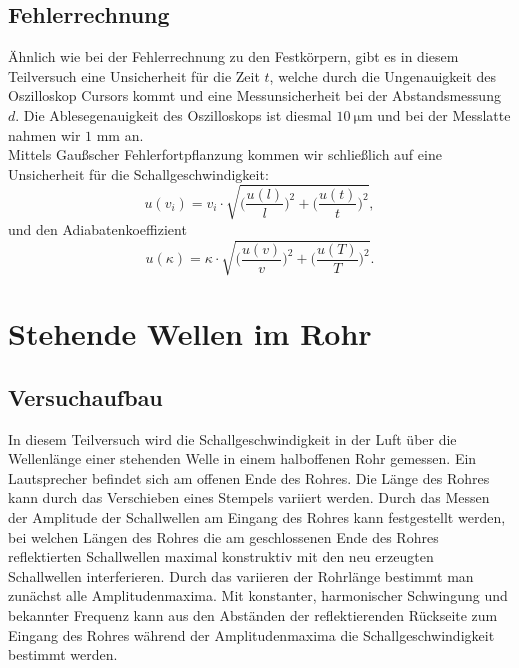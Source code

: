 \documentclass{article}
\begin{document}
\subsection{Fehlerrechnung}
Ähnlich wie bei der Fehlerrechnung zu den Festkörpern, gibt es in diesem Teilversuch eine Unsicherheit für die Zeit $t$, welche durch die Ungenauigkeit des Oszilloskop Cursors kommt und eine Messunsicherheit bei der Abstandsmessung $d$. Die Ablesegenauigkeit des Oszilloskops ist diesmal $\SI{10}{\micro\meter}$ und bei der Messlatte nahmen wir $1$ mm an. \\
Mittels Gaußscher Fehlerfortpflanzung kommen wir schließlich auf eine Unsicherheit für die Schallgeschwindigkeit:
\begin{equation}
    u(v_i) = v_i \cdot \sqrt{\bigg(\frac{u(l)}{l}\bigg)^2 + \bigg(\frac{u(t)}{t}\bigg)^2},
\end{equation}
und den Adiabatenkoeffizient 
\begin{equation}
    u(\kappa) = \kappa \cdot \sqrt{\bigg(\frac{u(v)}{v}\bigg)^2 + \bigg(\frac{u(T)}{T}\bigg)^2}.
\end{equation}
\section{Stehende Wellen im Rohr}
\subsection{Versuchaufbau}
In diesem Teilversuch wird die Schallgeschwindigkeit in der Luft über die Wellenlänge einer stehenden Welle in einem halboffenen Rohr gemessen.
Ein Lautsprecher befindet sich am offenen Ende des Rohres.
Die Länge des Rohres kann durch das Verschieben eines Stempels variiert werden. 
Durch das Messen der Amplitude der Schallwellen am Eingang des Rohres kann festgestellt werden, bei welchen Längen des Rohres die am geschlossenen Ende des Rohres reflektierten Schallwellen maximal konstruktiv mit den neu erzeugten Schallwellen interferieren. 
Durch das variieren der Rohrlänge bestimmt man zunächst alle Amplitudenmaxima.
Mit konstanter, harmonischer Schwingung und bekannter Frequenz kann aus den Abständen der reflektierenden Rückseite zum Eingang des Rohres während der Amplitudenmaxima die Schallgeschwindigkeit bestimmt werden.
\end{document}
